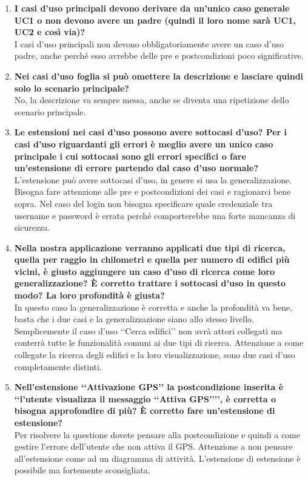 \documentclass[a4paper,titlepage]{article}
\begin{document}
\begin{enumerate}
	\item \textbf{I casi d'uso principali devono derivare da un'unico caso generale UC1 o non devono avere un padre (quindi il loro nome sarà UC1, UC2 e così via)?} \\
	I casi d'uso principali non devono obbligatoriamente avere un caso d'uso padre, anche perché esso avrebbe delle pre e postcondizioni poco significative.
	\item \textbf{Nei casi d'uso foglia si può omettere la descrizione e lasciare quindi solo lo scenario principale?} \\
	No, la descrizione va sempre messa, anche se diventa una ripetizione dello scenario principale.
	\item \textbf{Le estensioni nei casi d'uso possono avere sottocasi d’uso? Per i casi d'uso riguardanti gli errori è meglio avere un unico caso principale i cui sottocasi sono gli errori specifici o fare un'estensione di errore partendo dal caso d'uso normale?} \\
	L'estensione può avere sottocasi d'uso, in genere si usa la generalizzazione. Bisogna fare attenzione alle pre e postcondizioni dei casi e ragionarci bene sopra. Nel caso del login non bisogna specificare quale credenziale tra username e password è errata perché comporterebbe una forte mancanza di sicurezza.
	\item \textbf{Nella nostra applicazione verranno applicati due tipi di ricerca, quella per raggio in chilometri e quella per numero di edifici più vicini, è giusto aggiungere un caso d'uso di ricerca come loro generalizzazione? È corretto trattare i sottocasi d'uso in questo modo? La loro profondità è giusta?} \\
	In questo caso la generalizzazione è corretta e anche la profondità va bene, basta che i due casi e la generalizzazione siano allo stesso livello. Semplicemente il caso d'uso ‘‘Cerca edifici’’ non avrà attori collegati ma conterrà tutte le funzionalità comuni ai due tipi di ricerca. Attenzione a come collegate la ricerca degli edifici e la loro visualizzazione, sono due casi d'uso completamente distinti.
	\item \textbf{Nell'estensione ‘‘Attivazione GPS’’ la postcondizione inserita è ‘‘l'utente visualizza il messaggio ‘‘Attiva GPS’’’’, è corretta o bisogna approfondire di più? È corretto fare un'estensione di estensione?} \\
	Per risolvere la questione dovete pensare alla postcondizione e quindi a come gestire l'errore dell'utente che non attiva il GPS. Attenzione a non pensare all'estensione come ad un diagramma di attività. L'estensione di estensione è possibile ma fortemente sconsigliata.

\end{enumerate}
\end{document}
